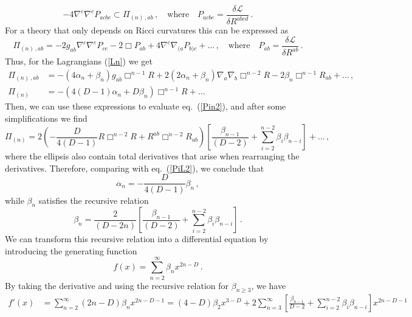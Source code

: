 \documentclass[11pt]{article}
\newcommand{\req}[1]{(\ref{#1})} %
\renewcommand{\req}[1]{eq.~(\ref{#1})}
\begin{document}
{\begin{equation}
-4\nabla^{c}\nabla^{e}P_{acbe}\subset \Pi_{(n)\, ,ab}\, ,\quad \text{where}\quad P_{acbe}=\frac{\delta \mathcal{L}}{\delta R^{abcd}}\, .
\end{equation}
For a theory that only depends on Ricci curvatures this can be expressed as 
\begin{equation}
\Pi_{(n)\, ,ab}=-2 g_{ab}\nabla^{c}\nabla^{e} P_{ce}-2\Box P_{ab}+4\nabla^{c}\nabla_{(a}P_{b)c}+\ldots\, ,\quad  \text{where}\quad P_{ab}=\frac{\delta \mathcal{L}}{\delta R^{ab}}\, .
\end{equation}
Thus, for the Lagrangians (\ref{Ln}) we get
\begin{align}
\Pi_{(n)\, ,ab}&=-(4\alpha_n+\beta_n)g_{ab}\Box^{n-1}R+2(2\alpha_n+\beta_n)\nabla_{a}\nabla_{b}\Box^{n-2}R-2\beta_{n}\Box^{n-1}R_{ab}+\ldots\, ,\\
\Pi_{(n)}&=-\left(4(D-1)\alpha_n+D \beta_n\right)\Box^{n-1}R+\ldots \, 
\end{align}
Then, we can use these expressions to evaluate \req{Pin2}, and after some simplifications we find
\begin{equation}
\Pi_{(n)}=2\left(-\frac{D}{4(D-1)}R\Box^{n-2} R+R^{ab}\Box^{n-2}R_{ab}\right)\left[\frac{\beta_{n-1}}{(D-2)}+\sum_{i=2}^{n-2}\beta_{i}\beta_{n-i}\right]+\ldots\, ,
\end{equation}
where the ellipsis also contain total derivatives that arise when rearranging the derivatives. Therefore, comparing with \req{PiL2}, we conclude that 
\begin{equation}
\alpha_{n}=-\frac{D}{4(D-1)}\beta_{n}\, ,
\end{equation}
while $\beta_{n}$ satisfies the recursive relation 
\begin{equation}
\beta_{n}=\frac{2}{(D-2n)}\left[\frac{\beta_{n-1}}{(D-2)}+\sum_{i=2}^{n-2}\beta_{i}\beta_{n-i}\right]\, .
\end{equation}
We can transform this recursive relation into a differential equation by introducing the generating function 
\begin{equation}\label{smallf}
f(x)=\sum_{n=2}^{\infty}\beta_{n}x^{2n-D}\, .
\end{equation}
By taking the derivative and using the recursive relation for $\beta_{n\ge 3}$, we have 
\begin{equation}
\begin{aligned}
f'(x)&=\sum_{n=2}^{\infty}(2n-D)\beta_{n}x^{2n-D-1}=(4-D)\beta_{2} x^{3-D}+2\sum_{n=3}^{\infty}\left[\frac{\beta_{n-1}}{D-2}+\sum_{i=2}^{n-2}\beta_{i}\beta_{n-i}\right]x^{2n-D-1}\\

\end{aligned}
\end{equation}}
\end{document}
